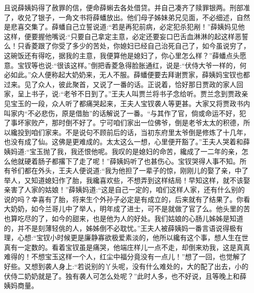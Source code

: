 \begin{parag}
    且说薛姨妈得了赦罪的信，便命薛蝌去各处借贷。并自己凑齐了赎罪银两。刑部准了，收兑了银子，一角文书将薛蟠放出。他们母子姊妹弟兄见面，不必细述，自然是悲喜交集了。薛蟠自己立誓说道:“若是再犯前病，必定犯杀犯剐！”薛姨妈见他这样，便要握他嘴说:“只要自己拿定主意，必定还要妄口巴舌血淋淋的起这样恶誓么！只香菱跟了你受了多少的苦处，你媳妇已经自己治死自己了，如今虽说穷了，这碗饭还有得吃，据我的主意，我便算他是媳妇了，你心里怎么样？”薛蟠点头愿意。宝钗等也说:“很该这样。”倒把香菱急得脸胀通红，说是:“伏侍大爷一样的，何必如此。”众人便称起大奶奶来，无人不服。薛蟠便要去拜谢贾家，薛姨妈宝钗也都过来。见了众人，彼此聚首，又说了一番的话。正说着，恰好那日贾政的家人回家，呈上书子，说:“老爷不日到了。”王夫人叫贾兰将书子念给听。贾兰念到贾政亲见宝玉的一段，众人听了都痛哭起来，王夫人宝钗袭人等更甚。大家又将贾政书内叫家内“不必悲伤，原是借胎”的话解说了一番。“与其作了官，倘或命运不好，犯了事坏家败产，那时倒不好了。宁可咱们家出一位佛爷，倒是老爷太太的积德，所以纔投到咱们家来。不是说句不顾前后的话，当初东府里太爷倒是修炼了十几年，也没有成了仙。这佛是更难成的。太太这么一想，心里便开豁了。”王夫人哭着和薛姨妈道:“宝玉抛了我，我还恨他呢。我叹的是媳妇的命苦，纔成了一二年的亲，怎么他就硬着肠子都撂下了走了呢！”薛姨妈听了也甚伤心。宝钗哭得人事不知。所有爷们都在外头，王夫人便说道:“我为他担了一辈子的惊，刚刚儿的娶了亲，中了举人，又知道媳妇作了胎，我纔喜欢些，不想弄到这样结局！早知这样，就不该娶亲害了人家的姑娘！”薛姨妈道:“这是自己一定的，咱们这样人家，还有什么别的说的吗？幸喜有了胎，将来生个外孙子必定是有成立的，后来就有了结果了。你看大奶奶，如今兰哥儿中了举人，明年成了进士，可不是就做了官了么。他头里的苦也算吃尽的了，如今的甜来，也是他为人的好处。我们姑娘的心肠儿姊姊是知道的，并不是刻薄轻佻的人，姊姊倒不必耽忧。”王夫人被薛姨妈一番言语说得极有理，心想:“宝钗小时候更是廉静寡欲极爱素淡的，他所以纔有这个事，想人生在世真有一定数的。看着宝钗虽是痛哭，他端庄样儿一点不走，却倒来劝我，这是真真难得的！不想宝玉这样一个人，红尘中福分竟没有一点儿！”想了一回，也觉解了好些。又想到袭人身上:“若说别的丫头呢，没有什么难处的，大的配了出去，小的伏侍二奶奶就是了。独有袭人可怎么处呢？”此时人多，也不好说，且等晚上和薛姨妈商量。
\end{parag}


